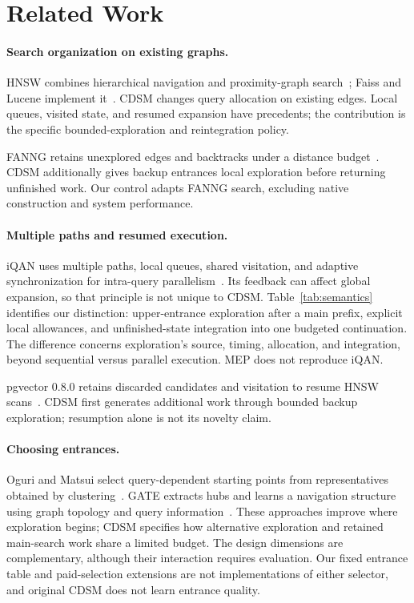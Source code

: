 \section{Related Work}
\label{sec:related}



\paragraph{Search organization on existing graphs.}
HNSW combines hierarchical navigation and proximity-graph search~\cite{hnsw}; Faiss and Lucene implement it~\cite{faiss,lucene}. CDSM changes query allocation on existing edges. Local queues, visited state, and resumed expansion have precedents; the contribution is the specific bounded-exploration and reintegration policy.

FANNG retains unexplored edges and backtracks under a distance budget~\cite{fanng}. CDSM additionally gives backup entrances local exploration before returning unfinished work. Our control adapts FANNG search, excluding native construction and system performance.

\paragraph{Multiple paths and resumed execution.}
iQAN uses multiple paths, local queues, shared visitation, and adaptive synchronization for intra-query parallelism~\cite{iqan}. Its feedback can affect global expansion, so that principle is not unique to CDSM. Table~\ref{tab:semantics} identifies our distinction: upper-entrance exploration after a main prefix, explicit local allowances, and unfinished-state integration into one budgeted continuation. The difference concerns exploration's source, timing, allocation, and integration, beyond sequential versus parallel execution. MEP does not reproduce iQAN.

pgvector 0.8.0 retains discarded candidates and visitation to resume HNSW scans~\cite{pgvector}. CDSM first generates additional work through bounded backup exploration; resumption alone is not its novelty claim.

\paragraph{Choosing entrances.}
Oguri and Matsui select query-dependent starting points from representatives obtained by clustering~\cite{oguri}. GATE extracts hubs and learns a navigation structure using graph topology and query information~\cite{gate}. These approaches improve where exploration begins; CDSM specifies how alternative exploration and retained main-search work share a limited budget. The design dimensions are complementary, although their interaction requires evaluation. Our fixed entrance table and paid-selection extensions are not implementations of either selector, and original CDSM does not learn entrance quality.

